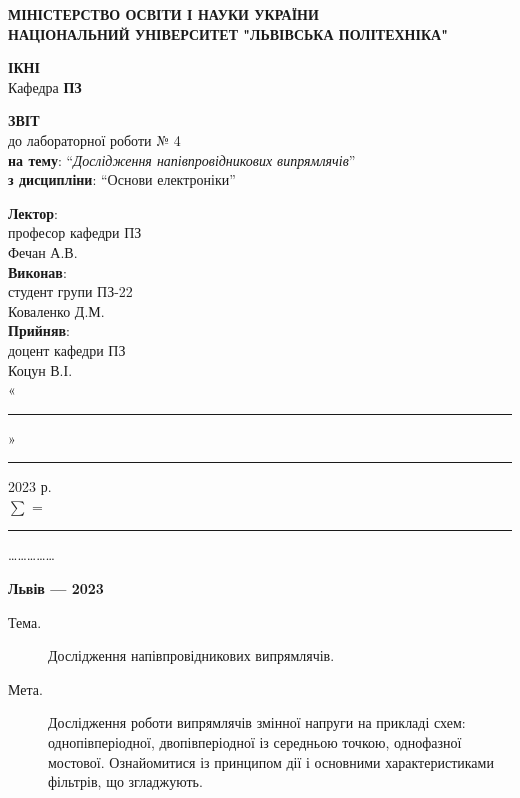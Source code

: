 \documentclass{article}
\newcommand\subject{Основи електроніки}
\newcommand\lecturer{професор кафедри ПЗ \\ Фечан А.В.}
\newcommand\teacher{доцент кафедри ПЗ \\ Коцун В.І.}
\newcommand\mygroup{ПЗ-22}
\newcommand\lab{4}
\newcommand\theme{Дослідження напівпровідникових випрямлячів}
\newcommand\purpose{Дослідження роботи випрямлячів змінної напруги на прикладі схем: однопівперіодної, двопівперіодної із середньою точкою, однофазної мостової. Ознайомитися із принципом дії і основними характеристиками фільтрів, що
	згладжують}
\begin{document}
\begin{normalsize}
	\begin{titlepage}
		\thispagestyle{empty}
		\begin{center}
			\textbf{МІНІСТЕРСТВО ОСВІТИ І НАУКИ УКРАЇНИ\\
				НАЦІОНАЛЬНИЙ УНІВЕРСИТЕТ "ЛЬВІВСЬКА ПОЛІТЕХНІКА"}
		\end{center}
		\begin{flushright}
			\textbf{ІКНІ}\\
			Кафедра \textbf{ПЗ}
		\end{flushright}
		\vspace{200pt}
		\begin{center}
			\textbf{ЗВІТ}\\
			\vspace{10pt}
			до лабораторної роботи № \lab\\
			\textbf{на тему}: “\textit{\theme}”\\
			\textbf{з дисципліни}: “\subject”
		\end{center}
		\vspace{112pt}
		\begin{flushright}
			
			\textbf{Лектор}:\\
			\lecturer\\
			\vspace{28pt}
			\textbf{Виконав}:\\
			
			студент групи \mygroup\\
			Коваленко Д.М.\\
			\vspace{28pt}
			\textbf{Прийняв}:\\
			
			\teacher\\
			
			\vspace{28pt}
			«\rule{1cm}{0.15mm}» \rule{1.5cm}{0.15mm} 2023 р.\\
			$\sum$ = \rule{1cm}{0.15mm}……………\\
			
		\end{flushright}
		\vspace{\fill}
		\begin{center}
			\textbf{Львів — 2023}
		\end{center}
	\end{titlepage}
		
	\begin{description}
		\item[Тема.] \theme.
		\item[Мета.] \purpose.
	\end{description}


\end{normalsize}
\end{document}
